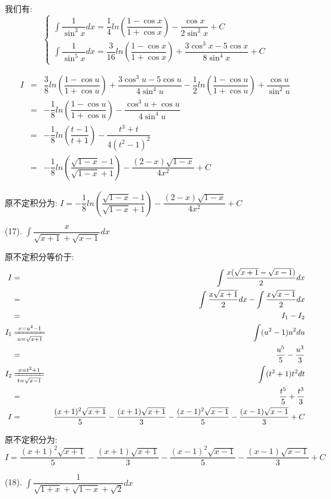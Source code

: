 \begin{anymark}[积分训练]
\begin{solution}
		我们有:
		$$\left\lbrace
		\begin{array}{l}
			\int \dfrac{1}{\sin^3 x}dx=\dfrac{1}{4}ln\left(\dfrac{1-\cos x}{1+\cos x} \right)-\dfrac{\cos x}{2\sin^2 x}+C\\
			\int \dfrac{1}{\sin^5 x}dx=\dfrac{3}{16}ln\left(\dfrac{1-\cos x}{1+\cos x} \right)+\dfrac{3\cos^3 x-5\cos x}{8\sin^4x}+C
		\end{array}
		\right. $$
		
		\begin{eqnarray*}
			I&=&\dfrac{3}{8}ln\left(\dfrac{1-\cos u}{1+\cos u} \right)+\dfrac{3\cos^3 u-5\cos u}{4\sin^4u}-\dfrac{1}{2}ln\left(\dfrac{1-\cos u}{1+\cos u} \right)+\dfrac{\cos u}{\sin^2 u}\\
			&=&-\dfrac{1}{8}ln\left(\dfrac{1-\cos u}{1+\cos u} \right)-\dfrac{\cos^3 u+\cos u}{4\sin^4 u}\\
			&=&-\dfrac{1}{8}ln\left(\dfrac{t-1}{t+1} \right)-\dfrac{t^3+t}{4(t^2-1)^2}\\
			&=&-\dfrac{1}{8}ln\left(\dfrac{\sqrt{1-x}-1}{\sqrt{1-x}+1} \right)-\dfrac{(2-x)\sqrt{1-x}}{4x^2}+C
		\end{eqnarray*}
	
		原不定积分为:  $I=-\dfrac{1}{8}ln\left(\dfrac{\sqrt{1-x}-1}{\sqrt{1-x}+1} \right)-\dfrac{(2-x)\sqrt{1-x}}{4x^2}+C$
	\end{solution}
	(17). $\int \dfrac{x}{\sqrt{x+1}+\sqrt{x-1}}dx$
	\begin{solution}
		
		原不定积分等价于:  
		\begin{eqnarray*}
			I&=&\int \dfrac{x(\sqrt{x+1}-\sqrt{x-1})}{2}dx\\
			&=&\int \dfrac{x\sqrt{x+1}}{2}dx-\int \dfrac{x\sqrt{x-1}}{2}dx\\
			&=&I_{1}-I_{2}\\
			I_{1}&\xlongequal[u=\sqrt{x+1}]{x=u^2-1}&\int (u^2-1)u^2du\\
			&=&\dfrac{u^5}{5}-\dfrac{u^3}{3}\\
			I_{2}&\xlongequal[t=\sqrt{x-1}]{x=t^2+1}&\int (t^2+1)t^2dt\\
			&=&\dfrac{t^5}{5}+\dfrac{t^3}{3}\\
			I&=&\dfrac{(x+1)^2\sqrt{x+1}}{5}-\dfrac{(x+1)\sqrt{x+1}}{3}-\dfrac{(x-1)^2\sqrt{x-1}}{5}-\dfrac{(x-1)\sqrt{x-1}}{3}+C
		\end{eqnarray*}
		
		原不定积分为:  $I=\dfrac{(x+1)^2\sqrt{x+1}}{5}-\dfrac{(x+1)\sqrt{x+1}}{3}-\dfrac{(x-1)^2\sqrt{x-1}}{5}-\dfrac{(x-1)\sqrt{x-1}}{3}+C$
	\end{solution}
	(18). $\int \dfrac{1}{\sqrt{1+x}+\sqrt{1-x}+\sqrt{2}}dx$
	\begin{solution}
		

\end{solution}
\end{anymark}

